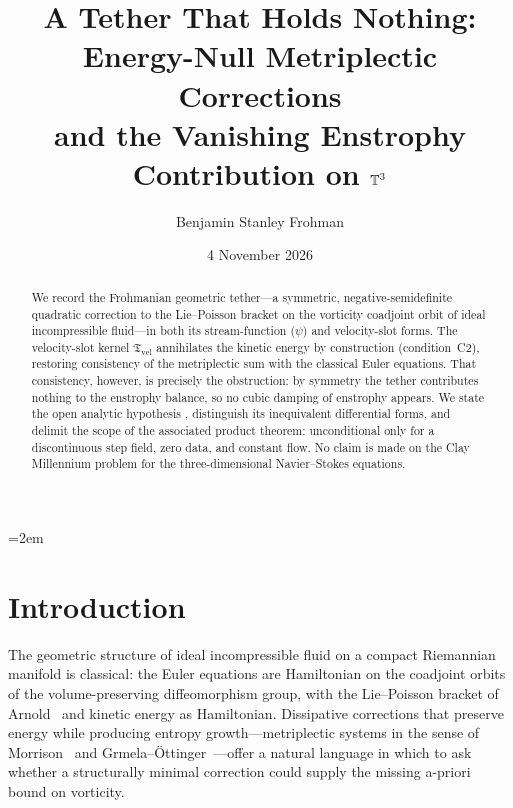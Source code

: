 \documentclass[11pt,reqno]{amsart}
\title[A Tether That Holds Nothing]{%
  A Tether That Holds Nothing:\\
  Energy-Null Metriplectic Corrections\\
  and the Vanishing Enstrophy Contribution on $\mathbb{T}^3$}
\author{Benjamin Stanley Frohman}
\date{4 November 2026}
\theoremstyle{plain}
\theoremstyle{definition}
\theoremstyle{remark}
\newcommand{\Tvel}{\mathfrak{T}_{\mathrm{vel}}}
\newcommand{\Lean}[1]{\texttt{\detokenize{#1}}}
\begin{document}
\emergencystretch=2em
\begin{abstract}
We record the Frohmanian geometric tether---a symmetric, negative-semidefinite
quadratic correction to the Lie--Poisson bracket on the vorticity coadjoint
orbit of ideal incompressible fluid---in both its stream-function ($\psi$) and
velocity-slot forms. The velocity-slot kernel $\Tvel$ annihilates the kinetic
energy by construction (condition~C2), restoring consistency of the metriplectic
sum with the classical Euler equations. That consistency, however, is precisely
the obstruction: by symmetry the tether contributes nothing to the enstrophy
balance, so no cubic damping of enstrophy appears. We state the open analytic
hypothesis \Lean{FrohmanianTetherRate}, distinguish its inequivalent differential
forms, and delimit the scope of the associated product theorem: unconditional
only for a discontinuous step field, zero data, and constant flow. No claim is
made on the Clay Millennium problem for the three-dimensional Navier--Stokes
equations.
\end{abstract}

\maketitle

\section{Introduction}\label{sec:intro}

The geometric structure of ideal incompressible fluid on a compact Riemannian
manifold is classical: the Euler equations are Hamiltonian on the coadjoint
orbits of the volume-preserving diffeomorphism group, with the Lie--Poisson
bracket of Arnold~\cite{Arnold1966,ArnoldKhesin} and kinetic energy as
Hamiltonian. Dissipative corrections that preserve energy while producing
entropy growth---metriplectic systems in the sense of
Morrison~\cite{Morrison1986} and Grmela--\"{O}ttinger~\cite{GrmelaOttinger1997}---offer
a natural language in which to ask whether a structurally minimal correction
could supply the missing a-priori bound on vorticity.
\end{document}
